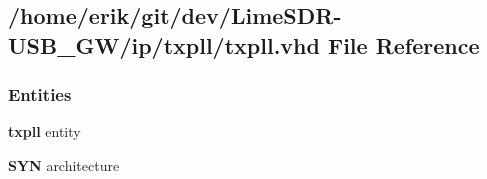 \subsection{/home/erik/git/dev/\+Lime\+S\+D\+R-\/\+U\+S\+B\+\_\+\+G\+W/ip/txpll/txpll.vhd File Reference}
\label{txpll_8vhd}
\subsubsection*{Entities}
\begin{DoxyCompactItemize}
\item 
{\bf txpll} entity
\item 
{\bf S\+YN} architecture
\end{DoxyCompactItemize}

